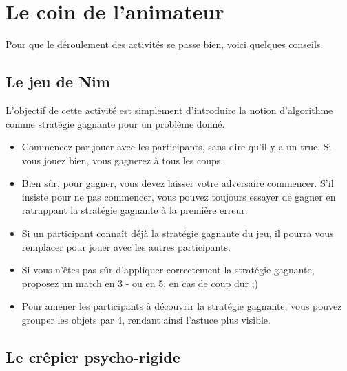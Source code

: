 \documentclass[a5paper,pagesize,DIV=14]{scrbook}
\begin{document}
\chapter*{Le coin de l'animateur}
\label{chap:coin-animateur}

Pour que le déroulement des activités se passe bien, voici quelques conseils.


\section*{Le jeu de Nim}

L'objectif de cette activité est simplement d'introduire la notion d'algorithme comme stratégie gagnante pour un problème donné.

\begin{itemize}
  \item Commencez par jouer avec les participants, sans dire qu'il y a un truc. Si vous jouez bien, vous gagnerez à tous les coups.
  \item Bien sûr, pour gagner, vous devez laisser votre adversaire commencer. S'il insiste pour ne pas commencer, vous pouvez toujours essayer de gagner en ratrappant la stratégie gagnante à la première erreur.
  \item Si un participant connaît déjà la stratégie gagnante du jeu, il pourra vous remplacer pour jouer avec les autres participants.
  \item Si vous n'êtes pas sûr d'appliquer correctement la stratégie gagnante, proposez un match en 3 - ou en 5, en cas de coup dur ;)
  \item Pour amener les participants à découvrir la stratégie gagnante, vous pouvez grouper les objets par 4, rendant ainsi l'astuce plus visible.
\end{itemize}

\section*{Le crêpier psycho-rigide}
\end{document}
